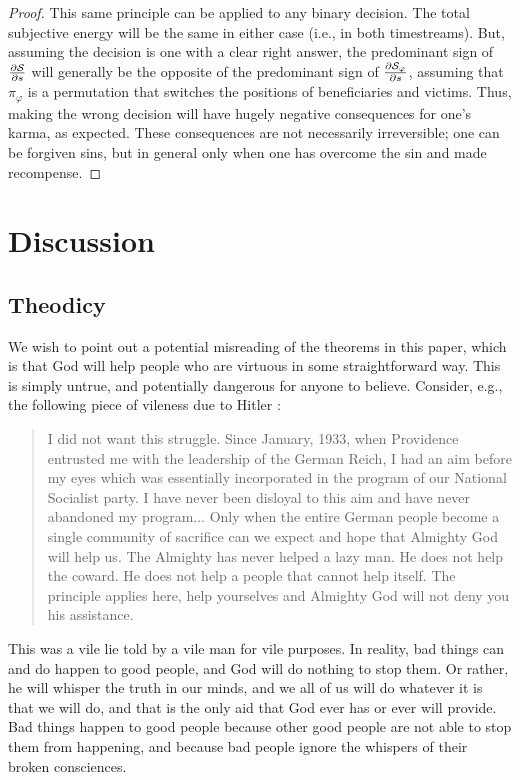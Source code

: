 \documentclass{article}
\begin{document}
\begin{proof}
This same principle can be applied to any binary decision. The total
subjective energy will be the same in either case (i.e., in both
timestreams). But, assuming the decision is one with a clear right
answer, the predominant sign of $\frac{\partial {\mathcal S}}{\partial s}$
will generally be the opposite of the predominant sign of
$\frac{\partial {\mathcal S}_\varphi}{\partial s}$, assuming that
$\pi_\varphi$ is a permutation that switches the positions of
beneficiaries and victims. Thus, making the wrong decision will have
hugely negative consequences for one's karma, as expected. These
consequences are not necessarily irreversible; one can be forgiven
sins, but in general only when one has overcome the sin and made
recompense.
  
\end{proof}

\section{Discussion}

\subsection{Theodicy}

We wish to point out a potential misreading of the theorems in this
paper, which is that God will help people who are virtuous in some
straightforward way. This is simply untrue, and potentially dangerous
for anyone to believe. Consider, e.g., the following piece of vileness
due to Hitler \cite{hitler}:
\begin{quote}
I did not want this struggle. Since January, 1933, when Providence
entrusted me with the leadership of the German Reich, I had an aim
before my eyes which was essentially incorporated in the program of
our National Socialist party. I have never been disloyal to this aim
and have never abandoned my program... Only when the entire German
people become a single community of sacrifice can we expect and hope
that Almighty God will help us. The Almighty has never helped a lazy
man. He does not help the coward. He does not help a people that
cannot help itself. The principle applies here, help yourselves and
Almighty God will not deny you his assistance.
\end{quote}

This was a vile lie told by a vile man for vile purposes. In reality,
bad things can and do happen to good people, and God will do nothing
to stop them. Or rather, he will whisper the truth in our minds, and
we all of us will do whatever it is that we will do, and that is the
only aid that God ever has or ever will provide. Bad things happen to
good people because other good people are not able to stop them from
happening, and because bad people ignore the whispers of their broken
consciences.
\end{document}
